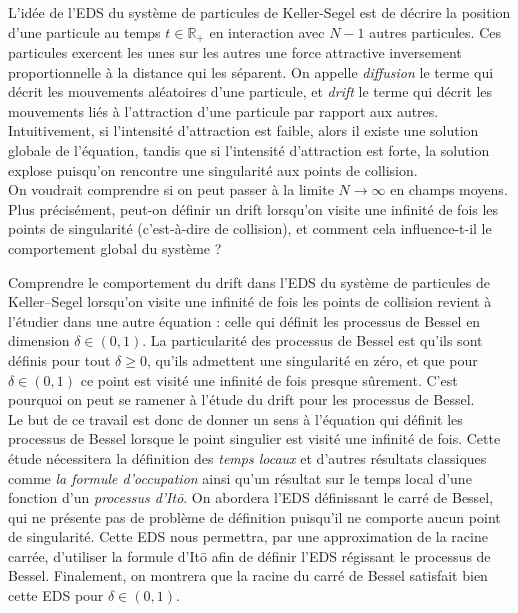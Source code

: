 \documentclass[openany]{book}
\newcommand{\R}{\mathbb{R}}
\newcommand{\1}{\mathbbm{1}}
\theoremstyle{thmfont}
\theoremstyle{deffont}
\theoremstyle{thmfont}
\theoremstyle{deffont}
\begin{document}
{L’idée de l’EDS du système de particules de Keller-Segel est de décrire la position d’une particule au temps $t \in \R_+$ en interaction avec $N-1$ autres particules. Ces particules exercent les unes sur les autres une force attractive inversement proportionnelle à la distance qui les séparent. On appelle \emph{diffusion} le terme qui décrit les mouvements aléatoires d’une particule, et \emph{drift} le terme qui décrit les mouvements liés à l’attraction d’une particule par rapport aux autres. Intuitivement, si l’intensité d’attraction est faible, alors il existe une solution globale de l’équation, tandis que si l’intensité d’attraction est forte, la solution explose puisqu’on rencontre une singularité aux points de collision.\\


On voudrait comprendre si on peut passer à la limite $N \to \infty$ en champs moyens. Plus précisément, peut-on définir un drift lorsqu’on visite une infinité de fois les points de singularité (c’est-à-dire de collision), et comment cela influence-t-il le comportement global du système ?

Comprendre le comportement du drift dans l’EDS du système de particules de Keller--Segel lorsqu’on visite une infinité de fois les points de collision revient à l’étudier dans une autre équation : celle qui définit les processus de Bessel en dimension $\delta \in (0,1)$. La particularité des processus de Bessel est qu’ils sont définis pour tout $\delta \geq 0$, qu’ils admettent une singularité en zéro, et que pour $\delta \in (0,1)$ ce point est visité une infinité de fois presque sûrement. C’est pourquoi on peut se ramener à l’étude du drift pour les processus de Bessel.\\


Le but de ce travail est donc de donner un sens à l’équation qui définit les processus de Bessel lorsque le point singulier est visité une infinité de fois. Cette étude nécessitera la définition des \textit{temps locaux} et d’autres résultats classiques comme \textit{la formule d’occupation} ainsi qu’un résultat sur le temps local d’une fonction d'un \textit{processus d’Itō}. On abordera l’EDS définissant le carré de Bessel, qui ne présente pas de problème de définition puisqu’il ne comporte aucun point de singularité. Cette EDS nous permettra, par une approximation de la racine carrée, d’utiliser la formule d’Itō afin de définir l’EDS régissant le processus de Bessel. Finalement, on montrera que la racine du carré de Bessel satisfait bien cette EDS pour $\delta \in (0,1)$.\\

}
\end{document}
